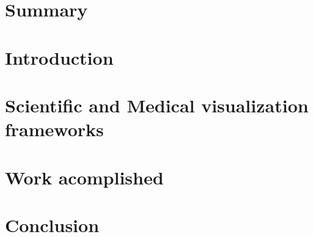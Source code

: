 
% 

\section{Summary}



\section{Introduction}




% 

\section{Scientific and Medical visualization frameworks}



\section{Work acomplished}



\section{Conclusion}




% 